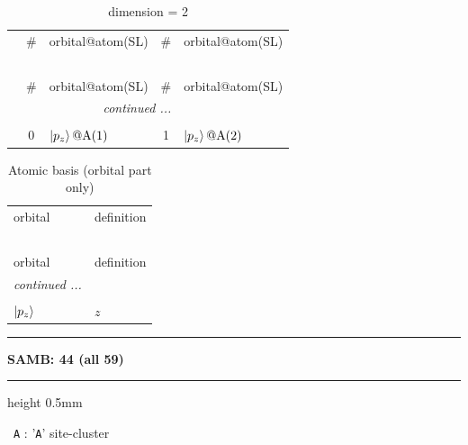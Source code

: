 \documentclass[fleqn,10pt,landscape]{jsarticle}
\begin{document}
\renewcommand{\arraystretch}{1.6}
\begin{longtable}[l]{c|cl|cl}
\captionsetup{justification=raggedright, singlelinecheck=off}
\caption{dimension = 2}
 \\
 \hline \hline
 & \# & orbital@atom(SL) & \# & orbital@atom(SL) \\ \hline \endfirsthead

\multicolumn{4}{l}{\tablename\ \thetable{}} \\
 \hline \hline
 & \# & orbital@atom(SL) & \# & orbital@atom(SL) \\ \hline \endhead

 \hline \hline
\multicolumn{4}{r}{\footnotesize\it continued ...} \\ \endfoot

 \hline \hline
\multicolumn{4}{r}{} \\ \endlastfoot

 & 0 & $\ket{p_{z}}@{\rm A}(1)$ & 1 & $\ket{p_{z}}@{\rm A}(2)$ \\
\end{longtable}
\renewcommand{\arraystretch}{1.6}
\begin{longtable}[l]{ll}
\captionsetup{justification=raggedright, singlelinecheck=off}
\caption{Atomic basis (orbital part only)}
 \\
 \hline \hline
orbital & definition \\ \hline \endfirsthead

\multicolumn{1}{l}{\tablename\ \thetable{}} \\
 \hline \hline
orbital & definition \\ \hline \endhead

 \hline \hline
\multicolumn{1}{r}{\footnotesize\it continued ...} \\ \endfoot

 \hline \hline
\multicolumn{1}{r}{} \\ \endlastfoot

$ \ket{p_{z}} $ & $ z $ \\
\end{longtable}
\vspace{5mm}
\noindent \rule[0.5mm]{5mm}{0.5mm}\hspace{3mm}\textbf{SAMB: 44 (all 59)}\hspace{3mm}\leaders\hrule height 0.5mm\hfill\kern0pt
\vspace{3mm}

\vspace{5mm}

\noindent\textbullet\, \texttt{A} : '\texttt{A}' site-cluster
\end{document}
